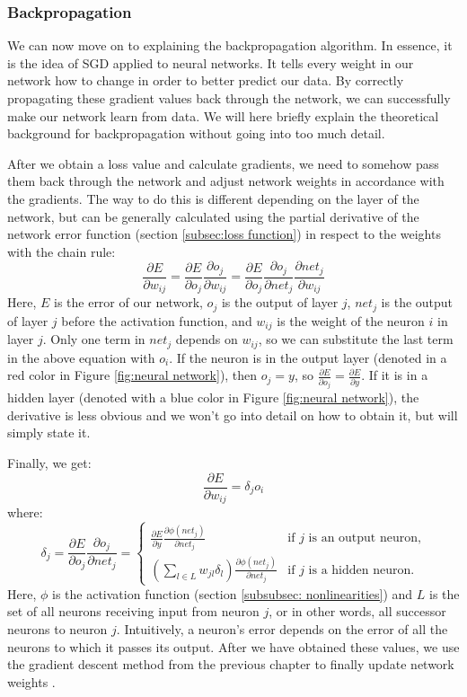 \documentclass[times, utf8, diplomski, english]{fer_eng}
\begin{document}
\subsubsection{Backpropagation}
\label{subsubsec:backpropagation}

We can now move on to explaining the backpropagation algorithm. In essence, it is the idea of SGD applied to neural networks. It tells every weight in our network how to change in order to better predict our data. By correctly propagating these gradient values back through the network, we can successfully make our network learn from data. We will here briefly explain the theoretical background for backpropagation without going into too much detail.

After we obtain a loss value and calculate gradients, we need to somehow pass them back through the network and adjust network weights in accordance with the gradients. The way to do this is different depending on the layer of the network, but can be generally calculated using the partial derivative of the network error function (section \ref{subsec:loss function}) in respect to the weights with the chain rule:
\[ \frac{\partial E}{\partial w_{ij}} = \frac{\partial E}{\partial o_j} \frac{\partial o_j}{\partial w_{ij}} = \frac{\partial E}{\partial o_j} \frac{\partial o_j}{\partial net_j} \frac{\partial net_j}{\partial w_{ij}}\]
Here, $E$ is the error of our network, $o_j$ is the output of layer $j$, $net_j$ is the output of layer $j$ before the activation function, and $w_{ij}$ is the weight of the neuron $i$ in layer $j$. Only one term in $net_j$ depends on $w_{ij}$, so we can substitute the last term in the above equation with $o_i$. If the neuron is in the output layer (denoted in a red color in Figure \ref{fig:neural network}), then $o_j = y$, so $\frac{\partial E}{\partial o_{j}} = \frac{\partial E}{\partial y}$. If it is in a hidden layer (denoted with a blue color in Figure \ref{fig:neural network}), the derivative is less obvious and we won't go into detail on how to obtain it, but will simply state it.

Finally, we get:
\[ \frac{\partial E}{\partial w_{ij}} = \delta_j o_i \]
where:
\[ \delta_j = \frac{\partial E}{\partial o_j} \frac{\partial o_j}{\partial net_j} = \begin{cases}
	\frac{\partial E}{\partial y} \frac{\partial \phi(net_j)}{\partial net_j} & \text{if $j$ is an output neuron,} \\
	(\sum_{l \in L} w_{jl} \delta_l) \frac{\partial \phi(net_j)}{\partial net_j} & \text{if $j$ is a hidden neuron.}
\end{cases}
\]
Here, $\phi$ is the activation function (section \ref{subsubsec: nonlinearities}) and $L$ is the set of all neurons receiving input from neuron $j$, or in other words, all successor neurons to neuron $j$. Intuitively, a neuron's error depends on the error of all the neurons to which it passes its output. After we have obtained these values, we use the gradient descent method from the previous chapter to finally update network weights \cite{Goodfellow-et-al-2016}.
\end{document}
